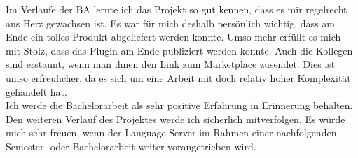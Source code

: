 Im Verlaufe der BA lernte ich das Projekt so gut kennen, dass es mir regelrecht ans Herz gewachsen ist.
Es war für mich deshalb persönlich wichtig, dass am Ende ein tolles Produkt abgeliefert werden konnte.
Umso mehr erfüllt es mich mit Stolz, dass das Plugin am Ende publiziert werden konnte.
Auch die Kollegen sind erstaunt, wenn man ihnen den Link zum Marketplace zusendet.
Dies ist umso erfreulicher, da es sich um eine Arbeit mit doch relativ hoher Komplexität gehandelt hat.\\

Ich werde die Bachelorarbeit als sehr positive Erfahrung in Erinnerung behalten.
Den weiteren Verlauf des Projektes werde ich sicherlich mitverfolgen.
Es würde mich sehr freuen, wenn der Language Server im Rahmen einer nachfolgenden Semester- oder Bachelorarbeit weiter vorangetrieben wird.


